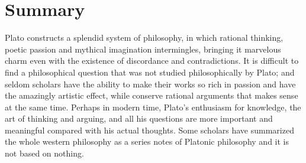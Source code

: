 \documentclass[11pt]{article}
\begin{document}
\begin{sloppypar}
\section{Summary}
Plato constructs a splendid system of philosophy, in which rational thinking, poetic passion and mythical imagination intermingles, bringing it marvelous charm even with the existence of discordance and contradictions. 
It is difficult to find a philosophical question that was not studied philosophically by Plato; 
and seldom scholars have the ability to make their works so rich in passion and have the amazingly artistic effect, while conserve rational arguments that makes sense at the same time. 
Perhaps in modern time, Plato’s enthusiasm for knowledge, the art of thinking and arguing, and all his questions are more important and meaningful compared with his actual thoughts. 
Some scholars have summarized the whole western philosophy as a series notes of Platonic philosophy and it is not based on nothing.

\end{sloppypar}
\end{document}

